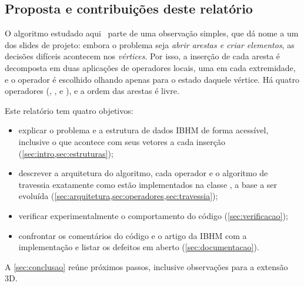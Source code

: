 \subsection{Proposta e contribuições deste relatório}

O algoritmo estudado aqui~\cite{slides} parte de uma observação simples, que dá nome a um dos slides de projeto: embora
o problema seja \emph{abrir arestas e criar elementos}, as decisões difíceis acontecem nos \emph{vértices}. Por isso,
a inserção de cada aresta é decomposta em duas aplicações de operadores locais, uma em cada extremidade, e o operador
é escolhido olhando apenas para o estado daquele vértice. Há quatro operadores (,
,  e ), e a ordem das arestas é livre.

Este relatório tem quatro objetivos:
\begin{itemize}
\item explicar o problema e a estrutura de dados IBHM de forma acessível, inclusive o que acontece com seus vetores a cada inserção (\cref{sec:intro,sec:estruturas});
\item descrever a arquitetura do algoritmo, cada operador e o algoritmo de travessia exatamente como estão
implementados na classe , a base a ser evoluída (\cref{sec:arquitetura,sec:operadores,sec:travessia});
\item verificar experimentalmente o comportamento do código (\cref{sec:verificacao});
\item confrontar os comentários do código e o artigo da IBHM com a implementação e listar os defeitos em aberto
(\cref{sec:documentacao}).
\end{itemize}
A \cref{sec:conclusao} reúne próximos passos, inclusive observações para a extensão 3D.
